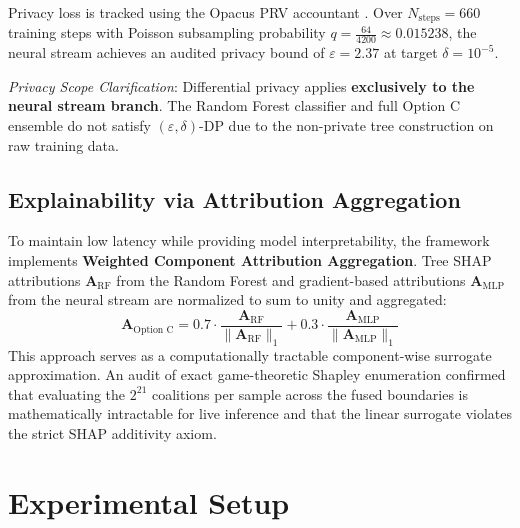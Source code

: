 \documentclass[10pt,journal,compsoc,twocolumn]{IEEEtran}
\begin{document}
Privacy loss is tracked using the Opacus PRV accountant \cite{mironov2017renyi}. Over $N_{\text{steps}} = 660$ training steps with Poisson subsampling probability $q = \frac{64}{4200} \approx 0.015238$, the neural stream achieves an audited privacy bound of $\varepsilon = 2.37$ at target $\delta = 10^{-5}$.

\textit{Privacy Scope Clarification}: Differential privacy applies \textbf{exclusively to the neural stream branch}. The Random Forest classifier and full Option C ensemble do not satisfy $(\varepsilon, \delta)$-DP due to the non-private tree construction on raw training data.

\subsection{Explainability via Attribution Aggregation}
To maintain low latency while providing model interpretability, the framework implements \textbf{Weighted Component Attribution Aggregation}. Tree SHAP attributions $\mathbf{A}_{\text{RF}}$ from the Random Forest and gradient-based attributions $\mathbf{A}_{\text{MLP}}$ from the neural stream are normalized to sum to unity and aggregated:
\begin{equation}
\mathbf{A}_{\text{Option C}} = 0.7 \cdot \frac{\mathbf{A}_{\text{RF}}}{\|\mathbf{A}_{\text{RF}}\|_1} + 0.3 \cdot \frac{\mathbf{A}_{\text{MLP}}}{\|\mathbf{A}_{\text{MLP}}\|_1}
\end{equation}
This approach serves as a computationally tractable component-wise surrogate approximation. An audit of exact game-theoretic Shapley enumeration confirmed that evaluating the $2^{21}$ coalitions per sample across the fused boundaries is mathematically intractable for live inference and that the linear surrogate violates the strict SHAP additivity axiom.

\section{Experimental Setup}
\end{document}
